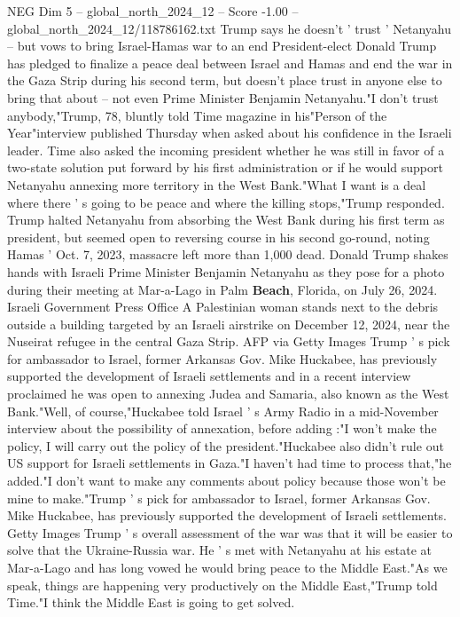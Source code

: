 \begin{textsample}{NEG Dim 5 – global\_north\_2024\_12 – Score -1.00 – global\_north\_2024\_12/118786162.txt}  \label{ex:f5_neg_335}
Trump says he doesn't ' trust ' Netanyahu -- but vows to bring Israel-Hamas war to an end President-elect Donald Trump has pledged to finalize a peace deal between Israel and Hamas and end the war in the Gaza Strip during his second term, but doesn't place trust in anyone else to bring that about -- not even Prime Minister Benjamin Netanyahu."I don't trust anybody,"Trump, 78, bluntly told Time magazine in his"Person of the Year"interview published Thursday when asked about his confidence in the Israeli leader.
Time also asked the incoming president whether he was still in favor of a two-state solution put forward by his first administration or if he would support Netanyahu annexing more territory in the West Bank."What I want is a deal where there ' s going to be peace and where the killing stops,"Trump responded.
Trump halted Netanyahu from absorbing the West Bank during his first term as president, but seemed open to reversing course in his second go-round, noting Hamas ' Oct. 7, 2023, massacre left more than 1,000 dead.
Donald Trump shakes hands with Israeli Prime Minister Benjamin Netanyahu as they pose for a photo during their meeting at Mar-a-Lago in Palm \textbf{Beach}, Florida, on July 26, 2024.
Israeli Government Press Office A Palestinian woman stands next to the debris outside a building targeted by an Israeli airstrike on December 12, 2024, near the Nuseirat refugee in the central Gaza Strip.
AFP via Getty Images Trump ' s pick for ambassador to Israel, former Arkansas Gov.
Mike Huckabee, has previously supported the development of Israeli settlements and in a recent interview proclaimed he was open to annexing Judea and Samaria, also known as the West Bank."Well, of course,"Huckabee told Israel ' s Army Radio in a mid-November interview about the possibility of annexation, before adding :"I won't make the policy, I will carry out the policy of the president."Huckabee also didn't rule out US support for Israeli settlements in Gaza."I haven't had time to process that,"he added."I don't want to make any comments about policy because those won't be mine to make."Trump ' s pick for ambassador to Israel, former Arkansas Gov.
Mike Huckabee, has previously supported the development of Israeli settlements.
Getty Images Trump ' s overall assessment of the war was that it will be easier to solve that the Ukraine-Russia war.
He ' s met with Netanyahu at his estate at Mar-a-Lago and has long vowed he would bring peace to the Middle East."As we speak, things are happening very productively on the Middle East,"Trump told Time."I think the Middle East is going to get solved.

\end{textsample}
